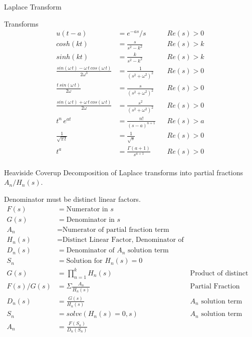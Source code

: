 \begin{section}{Laplace Transform}
\begin{subsection}{Transforms}
\begin{align*}
      u(t-a)&= e^{-as}/s && Re(s) > 0\\
      cosh(kt) &= \frac{s}{s^2-k^2} && Re(s) > k\\
      sinh(kt) &= \frac{k}{s^2-k^2} && Re(s) > k\\
      \frac{sin(\omega\,t)-\omega\,t\,cos(\omega\,t)}{2\omega^3}
           &= \frac{1}{(s^2+\omega^2)^2} && Re(s) > 0\\
      \frac{t\,sin(\omega\,t)}{2\omega}
           &= \frac{s}{(s^2+\omega^2)^2} && Re(s) > 0\\
      \frac{sin(\omega\,t)+\omega\,t\,cos(\omega\,t)}{2\omega}
           &= \frac{s^2}{(s^2+\omega^2)^2} && Re(s) > 0\\
      t^n\,e^{at} &= \frac{n!}{(s-a)^{n+1}} && Re(s) > a\\
      \frac{1}{\sqrt{\pi\,t}} &= \frac{1}{\sqrt{s}} && Re(s) > 0\\
      t^a &= \frac{\Gamma(a+1)}{s^{a+1}} && Re(s) > 0\\
    \end{align*}
  \end{subsection}

  \begin{subsection}{Heaviside Coverup}
    Decomposition of Laplace transforms into partial
    fractions $A_n/H_n(s)$.

    Denominator must be distinct linear factors.
    \begin{align*}
      F(s) &= \text{Numerator in $s$}\\
      G(s) &= \text{Denominator in $s$}\\
      A_n &= \text{Numerator of partial fraction term}\\
      H_n(s) &=
      \text{Distinct Linear Factor, Denominator of partial fraction term} \\
      D_n(s) &= \text{Denominator of $A_n$ solution term} \\
      S_n &= \text{Solution for $H_n(s)=0$} \\
      G(s) &= \prod\limits_{n=1}^{k} H_n(s) &&
              \text{Product of distinct linear factors} \\
      F(s)/G(s) &= \Sigma \frac{A_n}{H_{n}(s)} &&
              \text{Partial Fraction Decomposition} \\
      D_n(s) &= \frac{G(s)}{H_n(s)} && \text{$A_n$ solution term} \\
      S_n &= solve(H_n(s)=0,s) && \text{$A_n$ solution term} \\
      A_n &= \frac{F(S_n)}{D_n(S_n)} \\
    \end{align*}
  \end{subsection}

\end{section}
